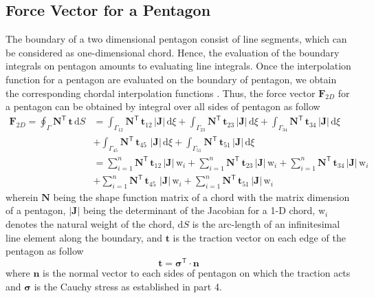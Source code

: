 \subsection{Force Vector for a Pentagon}
The boundary of a two dimensional pentagon consist of line segments, which can be considered as one-dimensional chord. Hence, the evaluation of the boundary integrals on pentagon amounts to evaluating line integrals. Once the interpolation function for a pentagon are evaluated on the boundary of pentagon, we obtain the corresponding chordal interpolation functions \cite{Reddy93}.
Thus, the force vector $\mathbf{F}_{2D}$  for a pentagon can be obtained by integral over all sides of pentagon as follow
\begin{equation}
\begin{aligned}
\mathbf{F}_{2D}  = \oint_{\Gamma} \mathbf{N}^{\mathsf{T}} \, \mathbf{t} \, \mathrm{d} S & = \int_{\Gamma_{12}} \mathbf{N}^{\mathsf{T}} \, \mathbf{t}_{12} \,|\mathbf{J}| \, \mathrm{d} \xi + \int_{\Gamma_{23}} \mathbf{N}^{\mathsf{T}} \, \mathbf{t}_{23} \,|\mathbf{J}| \, \mathrm{d} \xi + \int_{\Gamma_{34}} \mathbf{N}^{\mathsf{T}} \, \mathbf{t}_{34} \,|\mathbf{J}| \, \mathrm{d} \xi \\
& + \int_{\Gamma_{45}} \mathbf{N}^{\mathsf{T}} \, \mathbf{t}_{45} \, \,|\mathbf{J}| \, \mathrm{d} \xi + \int_{\Gamma_{51}} \mathbf{N}^{\mathsf{T}} \, \mathbf{t}_{51} \,|\mathbf{J}| \, \mathrm{d} \xi \\
& = \sum_{i=1}^{n} \mathbf{N}^{\mathsf{T}} \, \mathbf{t}_{12} \,|\mathbf{J}| \, \mathrm{w}_i + \sum_{i=1}^{n} \mathbf{N}^{\mathsf{T}} \, \mathbf{t}_{23} \,|\mathbf{J}| \, \mathrm{w}_i + \sum_{i=1}^{n} \mathbf{N}^{\mathsf{T}} \, \mathbf{t}_{34} \,|\mathbf{J}| \, \mathrm{w}_i \\
& + \sum_{i=1}^{n} \mathbf{N}^{\mathsf{T}} \, \mathbf{t}_{45} \, \,|\mathbf{J}| \, \mathrm{w}_i + \sum_{i=1}^{n} \mathbf{N}^{\mathsf{T}} \, \mathbf{t}_{51} \,|\mathbf{J}| \, \mathrm{w}_i
\end{aligned}
\end{equation}
wherein $\mathbf{N}$ being the shape function matrix of a chord with the matrix dimension of a pentagon, $|\mathbf{J}|$ being the determinant of the Jacobian for a 1-D chord, $\mathrm{w}_i$ denotes the natural weight of the chord, $\mathrm{d} S$ is the arc-length of an infinitesimal line element along the boundary, and $\mathbf{t}$ is the traction vector on each edge of the pentagon as follow
\begin{equation}
	\mathbf{t} = \boldsymbol{\sigma}^{\mathsf{T}} \cdot \mathbf{n} 
\end{equation}
where $ \mathbf{n} $ is the normal vector to each sides of pentagon on which the traction acts and $ \boldsymbol{\sigma} $ is the Cauchy stress as established in part 4.

